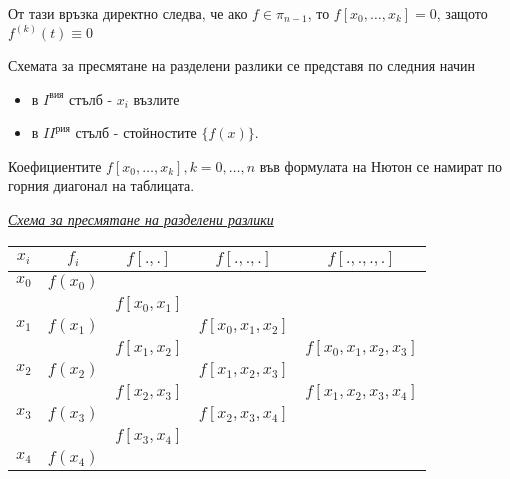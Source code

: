 \documentclass[12pt]{article}
\numberwithin{equation}{section}
\numberwithin{theorem}{section}
\numberwithin{definition}{section}
\numberwithin{corollary}{section}
\begin{document}
\par
От тази връзка директно следва, че ако $f\in\pi_{n-1}$, то $f[x_0,\dotso,x_k] = 0$, защото $f^(k)(t)\equiv 0$
\par
Схемата за пресмятане на разделени разлики се представя по следния начин
\begin{itemize}
    \item в $I^{\text{вия}}$ стълб - $x_i$ възлите
    \item в $II^{\text{рия}}$ стълб - стойностите $\{f(x)\}$. 
\end{itemize}
Коефициентите $f[x_0,\dotso,x_k], k=0,\dotso, n$ във формулата на Нютон се намират по горния диагонал на таблицата.
\begin{center}
\textit{\underline{Схема за пресмятане на разделени разлики}}
\begin{tabular}{|c c c c c|}
\hline
$x_i$&$f_i$&$f[.,.]$&$f[.,.,.]$&$f[.,.,.,.]$\\
\hline
$x_0$   &   $f(x_0)$&               &                 &\\
        &           & $f[x_0,x_1]$  &                 &\\
$x_1$   &   $f(x_1)$&               &$f[x_0,x_1,x_2]$ &\\
        &           & $f[x_1,x_2]$  &                 &$f[x_0,x_1,x_2,x_3]$\\
$x_2$   &$f(x_2)$   &               &$f[x_1,x_2,x_3]$ & \\
        &           & $f[x_2,x_3]$  &                 &$f[x_1,x_2,x_3,x_4]$\\
$x_3$   &$f(x_3)$   &               &$f[x_2,x_3,x_4]$ &\\
        &           & $f[x_3,x_4]$  &                 &\\
$x_4$   &$f(x_4)$   &               &                 &\\   
\hline
\end{tabular}
\end{center}
\newpage
\end{document}
